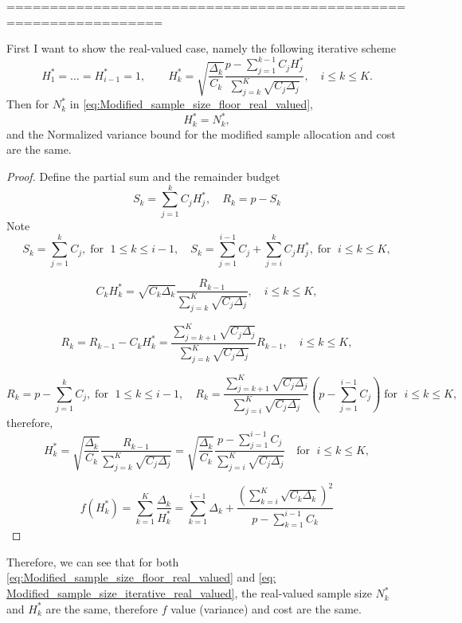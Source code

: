 ================================================================




\begin{theorem}
First I want to show the real-valued case, namely the following iterative scheme
%
\begin{equation}
    \label{eq: Modified_sample_size_iterative_real_valued}
    H_1^* = \ldots = H_{i-1}^* =1, \qquad H_k^*=\sqrt{\frac{\Delta_k}{C_k}}\frac{p-\sum_{j=1}^{k-1}C_j  H_j^* }{\sum_{j=k}^{K}\sqrt{C_j\Delta_j}}, \quad i\le k\le K.
\end{equation}
%
Then for $N_k^*$ in \eqref{eq:Modified_sample_size_floor_real_valued},
\[
H_k^*=N_k^*,
\]
%
and the Normalized variance bound for the modified sample allocation and cost are the same.
\end{theorem}

\begin{proof}
Define the partial sum and the remainder budget
%
\[
S_k=\sum_{j=1}^{k}C_jH_j^*, \quad R_k = p-S_k
\]
%
Note 
\[
S_k=\sum_{j=1}^k C_j,\; \text{for } \; 1\le k\le i-1, \quad S_k=\sum_{j=1}^{i-1} C_j+\sum_{j=i}^k C_jH_j^*, \; \text{for } \; i\le k\le K,
\]

\[
C_kH_k^* = \sqrt{C_k\Delta_k}\frac{R_{k-1}}{\sum_{j=k}^K \sqrt{C_j\Delta_j}}, \quad i\le k\le K,
\]

\[
R_k=R_{k-1}-C_kH_k^*=\frac{\sum_{j=k+1}^K\sqrt{C_j\Delta_j}}{\sum_{j=k}^K\sqrt{C_j\Delta_j}}R_{k-1}, \quad i\le k\le K,
\]

\[
R_k = p-\sum_{j=1}^k C_j,\; \text{for } \; 1\le k\le i-1,\quad R_k = \frac{\sum_{j=k+1}^K\sqrt{C_j\Delta_j}}{\sum_{j=i}^K\sqrt{C_j\Delta_j}}\left(p-\sum_{j=1}^{i-1}C_j\right)\; \text{for } \; i\le k\le K,
\]
therefore,
\[
H_k^*= \sqrt{\frac{\Delta_k}{C_k}}\frac{R_{k-1}}{\sum_{j=k}^{K}\sqrt{C_j\Delta_j}}=\sqrt{\frac{\Delta_k}{C_k}}\frac{p-\sum_{j=1}^{i-1}C_j}{\sum_{j=i}^{K}\sqrt{C_j\Delta_j}}\quad \text{for } \; i\le k\le K,
\]

\[
f(H_k^*)=\sum_{k=1}^K\frac{\Delta_k}{H_k^*}=\sum_{k=1}^{i-1}\Delta_k+\frac{\left(\sum_{k=i}^K \sqrt{C_k\Delta_k}\right)^2}{p-\sum_{k=1}^{i-1} C_k}
\]
\end{proof}
Therefore, we can see that for both \eqref{eq:Modified_sample_size_floor_real_valued} and \eqref{eq: Modified_sample_size_iterative_real_valued}, the real-valued sample size $N_k^*$ and $H_k^*$ are the same, therefore $f$ value (variance) and cost are the same.



